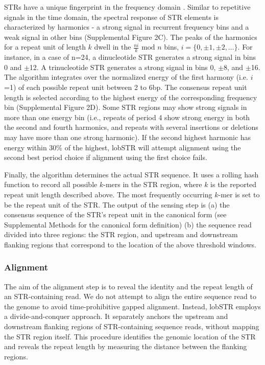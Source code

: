 STRs have a unique fingerprint in the frequency domain \cite{SharmaIssacRaghavaEtAl2004,ZhouDuYan2009}. Similar to repetitive signals in the time domain, the spectral response of STR elements is characterized by harmonics - a strong signal in recurrent frequency bins and a weak signal in other bins (Supplemental Figure 2C). The peaks of the harmonics for a repeat unit of length $k$ dwell in the $\frac{ni}{k} \text{ mod } n$ bins, $i = \{ 0, \pm 1, \pm 2, \hdots \}$. For instance, in a case of n=24, a dinucleotide STR generates a strong signal in bins 0 and $\pm$12. A trinucleotide STR generates a strong signal in bins 0, $\pm$8, and $\pm$16. The algorithm integrates over the normalized energy of the first harmony (i.e. $i$=1) of each possible repeat unit between 2 to 6bp. The consensus repeat unit length is selected according to the highest energy of the corresponding frequency bin (Supplemental Figure 2D). Some STR regions may show strong signals in more than one energy bin (i.e., repeats of period 4 show strong energy in both the second and fourth harmonics, and repeats with several insertions or deletions may have more than one strong harmonic). If the second highest harmonic has energy within 30\% of the highest, lobSTR will attempt alignment using the second best period choice if alignment using the first choice fails.

Finally, the algorithm determines the actual STR sequence. It uses a rolling hash function to record all possible $k$-mers in the STR region, where $k$ is the reported repeat unit length described above. The most frequently occurring $k$-mer is set to be the repeat unit of the STR. The output of the sensing step is (a) the consensus sequence of the STR’s repeat unit in the canonical form (see Supplemental Methods for the canonical form definition) (b) the sequence read divided into three regions: the STR region, and upstream and downstream flanking regions that correspond to the location of the above threshold windows. 

\subsubsection{Alignment}
The aim of the alignment step is to reveal the identity and the repeat length of an STR-containing read. We do not attempt to align the entire sequence read to the genome to avoid time-prohibitive gapped alignment. Instead, lobSTR employs a divide-and-conquer approach. It separately anchors the upstream and downstream flanking regions of STR-containing sequence reads, without mapping the STR region itself. This procedure identifies the genomic location of the STR and reveals the repeat length by measuring the distance between the flanking regions.

